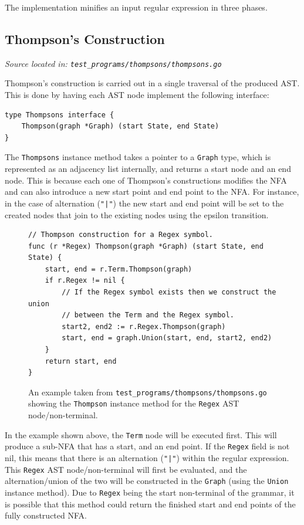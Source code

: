 \documentclass[]{full}
\theoremstyle{definition}
\begin{document}
The implementation minifies an input regular expression in three phases.

\subsection{Thompson's Construction}
\cprotect\textit{Source located in: \verb|test_programs/thompsons/thompsons.go|}

Thompson's construction is carried out in a single traversal of the produced AST. This is done by having each AST node implement the following interface:

\begin{verbatim}
type Thompsons interface {
    Thompson(graph *Graph) (start State, end State)
}
\end{verbatim}

The \verb|Thompsons| instance method takes a pointer to a \verb|Graph| type, which is represented as an adjacency list internally, and returns a start node and an end node. This is because each one of Thompson's constructions modifies the NFA and can also introduce a new start point and end point to the NFA. For instance, in the case of alternation (\verb+"|"+) the new start and end point will be set to the created nodes that join to the existing nodes using the epsilon transition.

\begin{figure}[H]
    \begin{verbatim}
// Thompson construction for a Regex symbol.
func (r *Regex) Thompson(graph *Graph) (start State, end State) {
    start, end = r.Term.Thompson(graph)
    if r.Regex != nil {
        // If the Regex symbol exists then we construct the union
        // between the Term and the Regex symbol.
        start2, end2 := r.Regex.Thompson(graph)
        start, end = graph.Union(start, end, start2, end2)
    }
    return start, end
}
    \end{verbatim}
    \cprotect\caption{An example taken from \verb|test_programs/thompsons/thompsons.go| showing the \verb|Thompson| instance method for the \verb|Regex| AST node/non-terminal.}
\end{figure}

In the example shown above, the \verb|Term| node will be executed first. This will produce a sub-NFA that has a start, and an end point. If the \verb|Regex| field is not nil, this means that there is an alternation (\verb+"|"+) within the regular expression. This \verb|Regex| AST node/non-terminal will first be evaluated, and the alternation/union of the two will be constructed in the \verb|Graph| (using the \verb|Union| instance method). Due to \verb|Regex| being the start non-terminal of the grammar, it is possible that this method could return the finished start and end points of the fully constructed NFA.
\end{document}
